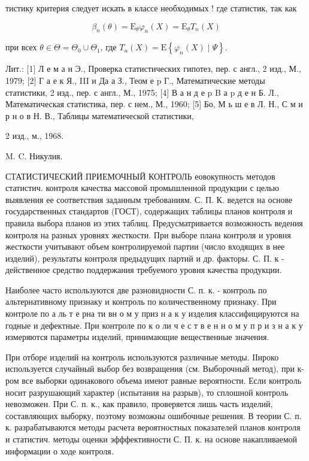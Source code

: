\documentclass[10pt]{article}
\begin{document}
тистику критерия следует искать в классе необходимых ! где статистик, так как



\[

\beta_{n}(\theta)=\mathrm{E}_{\theta} \varphi_{n}(X)=\mathrm{E}_{\theta} T_{n}(X)

\]



при всех $\theta \in \Theta=\Theta_{0} \cup \Theta_{1}$, где $T_{n}(X)=\mathrm{E}\left\{\varphi_{n}(X) \mid \Psi\right\}$.



Лит.: [1] Л е м а н Э., Проверка статистических гипотез, пер. с англ., 2 изд., М., 1979; [2] Г а е к Я., III и Да а З., Теом е p Г., Математические методы статистики, 2 изд., пер. с англ., М., 1975; [4] В а н д е p B а p д е н Б. Л., Математическая статистика, пер. с нем., М., 1960; [5] Бо, М ь ш е в Л. Н., С м и р н о в Н. В., Таблицы математической статистики,

2 изд., м., 1968.

M. C. Никулия.



СТАТИСТИЧЕСКИЙ ПРИЕМОЧНЫЙ КОНТРОЛЬ еовокупность методов статистич. контроля качества массовой промышленной продукции с целью выявления ее соответствия заданным требованиям. С. П. К. ведется на основе государственных стандартов (ГОСТ), содержащих таблицы планов контроля и правила выбора планов из этих таблиц. Предусматривается возможность ведения контроля на разных уровнях жесткости. При выборе плана контроля и уровня жесткости учитывают объем контролируемоӥ партии (число входящих в нее изделий), результаты контроля предыдущих партий и др. факторы. С. П. к - действенное средство поддержания требуемого уровня качества продукции.



Наиболее часто используются две разновидности С. п. к. - контроль по альтернативному признаку и контроль по количественному признаку. При контроле по а ль т е рна ти вн о м у приз н а к у изделия классифицируются на годные и дефектные. При контроле по к о ли ч е с т в е н н о м у п р и з н а к у измеряются параметры изделий, принимающие вещественные значения.



При отборе изделий на контроль используются различные методы. ІІироко используется случайный выбор без возвращения (см. Выборочный метод), при к-ром все выборки одинакового объема имеют равные вероятности. Если контроль носит разрушающий характер (испытания на разрыв), то сплошной контроль невозможен. При С. п. к., как правило, проверяется лишь часть изделий, составляющих выборку, поэтому возможны ошибочные решения. В теории С. п. к. разрабатываются методы расчета вероятностных показателей планов контроля и статистич. методы оценки эфффективности С. П. к. на основе накапливаемой информации о ходе контроля.
\end{document}
